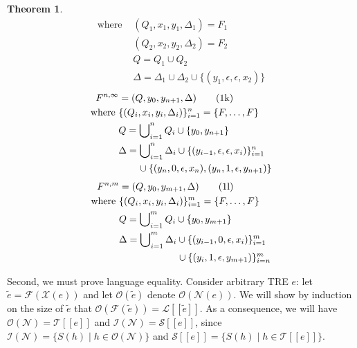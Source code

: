 \documentclass{article}
\newcommand{\Xin}{\!\in\!}
\newcommand{\Xeq}{\!=\!}
\newcommand{\Xlb}{[\![}
\newcommand{\Xrb}{]\!]}
\newcommand{\XF}{\mathcal{F}}
\newcommand{\XI}{\mathcal{I}}
\newcommand{\XL}{\mathcal{L}}
\newcommand{\XN}{\mathcal{N}}
\newcommand{\XO}{\mathcal{O}}
\newcommand{\XS}{\mathcal{S}}
\newcommand{\XT}{\mathcal{T}}
\newcommand{\XX}{\mathcal{X}}
\theoremstyle{definition}
\newtheorem{XThe}{Theorem}
\begin{document}
\begin{multicols}{2}
\begin{XThe}
\begin{align*}
        \text{where }
            & (Q_1, x_1, y_1, \Delta_1) = F_1 \\
            & (Q_2, x_2, y_2, \Delta_2) = F_2 \\
            & Q = Q_1 \cup Q_2  \\
            & \Delta = \Delta_1 \cup \Delta_2 \cup \{ (y_1, \epsilon, \epsilon, x_2) \}
    \end{align*}
%
    \begin{align*}
        F^{n,\infty} &= (Q, y_0, y_{n+1}, \Delta) \tag{1k} \label{tnfaunbounditerconstr} \\
        \text{where }
            & \{(Q_i, x_i, y_i, \Delta_i)\}_{i=1}^n = \{F, \dots, F\} \\
            & Q = \bigcup\nolimits_{i=1}^n Q_i \cup \{ y_0, y_{n+1} \} \\
            & \Delta = \bigcup\nolimits_{i=1}^n \Delta_i
                \cup \{(y_{i-1}, \epsilon, \epsilon, x_i)\}_{i=1}^n \\
                & \hphantom{\hspace{2em}}
                    \cup \{ (y_n, 0, \epsilon, x_n), (y_n, 1, \epsilon, y_{n+1}) \}
    \end{align*}
%
    \begin{align*}
        F^{n,m} &= (Q, y_0, y_{m+1}, \Delta) \tag{1l} \label{tnfabounditerconstr} \\
        \text{where }
            & \{(Q_i, x_i, y_i, \Delta_i)\}_{i=1}^m = \{F, \dots, F\} \\
            & Q = \bigcup\nolimits_{i=1}^m Q_i \cup \{ y_0, y_{m+1} \} \\
            & \Delta = \bigcup\nolimits_{i=1}^m \Delta_i
                \cup \{(y_{i-1}, 0, \epsilon, x_i)\}_{i=1}^m \\
                & \hphantom{\hspace{6em}}
                    \cup \{(y_i, 1, \epsilon, y_{m+1})\}_{i=n}^m
    \end{align*}

Second, we must prove language equality.
Consider arbitrary TRE $e$: let $\widetilde{e} \Xeq \XF(\XX(e))$
and let $\XO(\widetilde{e})$ denote $\XO(\XN(e))$.
We will show by induction on the size of $\widetilde{e}$ that $\XO(\XF(\widetilde{e})) \Xeq \XL \Xlb \widetilde{e} \Xrb$.
As a consequence, we will have $\XO(\XN) \Xeq \XT \Xlb e \Xrb$ and $\XI(\XN) \Xeq \XS \Xlb e \Xrb$,
since $\XI(\XN) \Xeq \{S(h) \mid h \Xin \XO(\XN)\}$ and
$\XS \Xlb e \Xrb \Xeq \{S(h) \mid h \Xin \XT \Xlb e \Xrb \}$.
\\


\end{XThe}
\end{multicols}
\end{document}
